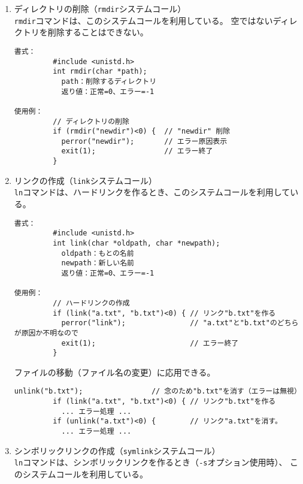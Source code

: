\documentclass[a4j,dvipdfmx]{jarticle}
\begin{document}
\begin{enumerate}
\begin{lstlisting}[numbers=none]
\end{lstlisting}

\item ディレクトリの削除（{\tt rmdir}システムコール）\\
{\tt rmdir}コマンドは、このシステムコールを利用している。
空ではないディレクトリを削除することはできない。
\begin{lstlisting}[numbers=none]
書式：
         #include <unistd.h>
         int rmdir(char *path);
           path：削除するディレクトリ
           返り値：正常=0、エラー=-1

使用例：
         // ディレクトリの削除
         if (rmdir("newdir")<0) {  // "newdir" 削除
           perror("newdir");       // エラー原因表示
           exit(1);                // エラー終了
         }

\end{lstlisting}

\newpage

\item リンクの作成（{\tt link}システムコール）\\
{\tt ln}コマンドは、ハードリンクを作るとき、このシステムコールを利用している。

\begin{lstlisting}[numbers=none]
書式：
         #include <unistd.h>
         int link(char *oldpath, char *newpath);
           oldpath：もとの名前
           newpath：新しい名前
           返り値：正常=0、エラー=-1

使用例：
         // ハードリンクの作成
         if (link("a.txt", "b.txt")<0) { // リンク"b.txt"を作る
           perror("link");               // "a.txt"と"b.txt"のどちらが原因か不明なので
           exit(1);                      // エラー終了
         }

\end{lstlisting}

ファイルの移動（ファイル名の変更）に応用できる。
\begin{lstlisting}[numbers=none]
         unlink("b.txt");                // 念のため"b.txt"を消す（エラーは無視）
         if (link("a.txt", "b.txt")<0) { // リンク"b.txt"を作る
           ... エラー処理 ... 
         if (unlink("a.txt")<0) {        // リンク"a.txt"を消す。
           ... エラー処理 ... 

\end{lstlisting}

\item シンボリックリンクの作成（{\tt symlink}システムコール）\\
{\tt ln}コマンドは、シンボリックリンクを作るとき（{\tt -s}オプション使用時）、
このシステムコールを利用している。


\end{enumerate}
\end{document}
